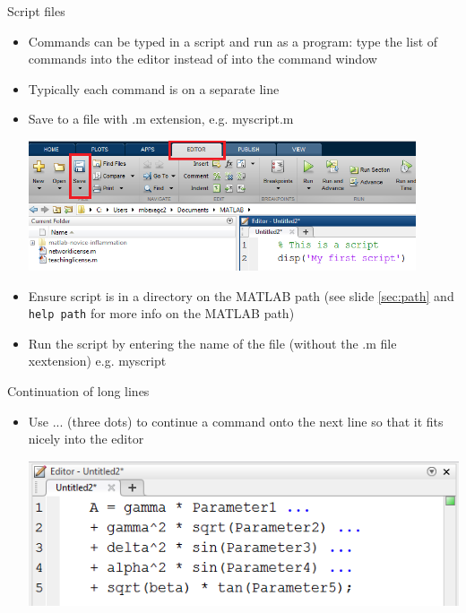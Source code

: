 \documentclass{beamer}
\begin{document}
\begin{frame}{Script files}
	\begin{itemize}
		\item Commands can be typed in a script and run as a program: type the list of commands into the editor instead of into the command window
		\item Typically each command is on a separate line
		\item Save to a file with .m extension, e.g. myscript.m
		
		\includegraphics[width=0.9\textwidth]{save_script}
		\item Ensure script is in a directory on the MATLAB path (see slide \ref{sec:path} and \texttt{help path} for more info on the MATLAB path)
		\item Run the script by entering the name of the file (without the .m file xextension) e.g. myscript
	\end{itemize}
\end{frame}

\begin{frame}{Continuation of long lines}
	\begin{itemize}
		\item Use ... (three dots) to continue a command onto the next line so that it fits nicely into the editor
		
		
		\includegraphics[scale=0.7]{editor_line_continuation}
	\end{itemize}
\end{frame}
\end{document}
